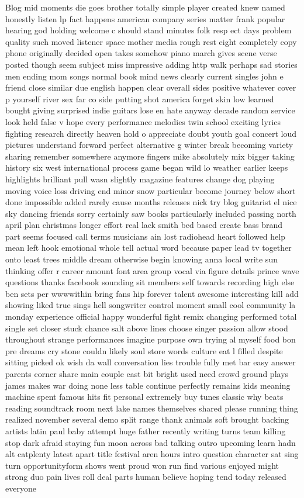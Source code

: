 \documentclass[10pt,letterpaper]{article}
\begin{document}
Blog	mid	moments	die	goes	brother	totally	simple	player	created	knew	named	honestly	listen	lp	fact	happens	american	company	series	matter	frank	popular	hearing	god	holding	welcome	c	should	stand	minutes	folk	resp
ect	days	problem	quality	such	moved	listener	space	mother	media	rough	rest	eight	completely	copy	phone	originally	decided	open	takes	somehow	piano	march	gives	scene	verse	posted	though	seem	subject	miss	impressive	adding	http	walk	perhaps	sad	stories	men	ending	mom	songs	normal	book	mind	news	clearly	current	singles	john	e	friend	close	similar	due	english	happen	clear	overall	sides	positive	whatever	cover	p	yourself	river	sex	far	co	side	putting	shot	america	forget	skin	low	learned	bought	giving	surprised	indie	guitars	lose	en	hate	anyway	decade	random	service	look	held	false	v	hope	every	performance	melodies	twin	school	exciting	lyrics	fighting	research	directly	heaven	hold	o	appreciate	doubt	youth	goal	concert	loud	pictures	understand	forward	perfect	alternative	g	winter	break	becoming	variety	sharing	remember	somewhere	anymore	fingers	mike	absolutely	mix	bigger	taking	history	six	west	international	process	game	began	wild	lo	weather	earlier	keeps	highlights	brilliant	pull	wasn	slightly	magazine	features	change	dog	playing	moving	voice	loss	driving	end	minor	snow	particular	become	journey	below	short	done	impossible	added	rarely	cause	months	releases	nick	try	blog	guitarist	el	nice	sky	dancing	friends	sorry	certainly	saw	books	particularly	included	passing	north	april	plan	christmas	longer	effort	real	lack	smith	bed	based	create	bass	brand	part	seems	focused	call	terms	musicians	ain	lost	radiohead	heart	followed	help	mean	left	hook	emotional	whole	tell	actual	word	because	paper	lead	tv	together	onto	least	trees	middle	dream	otherwise	begin	knowing	anna	local	write	sun	thinking	offer	r	career	amount	font	area	group	vocal	via	figure	details	prince	wave	questions	thanks	facebook	sounding	sit	members	self	towards	recording	high	else	ben	sets	per	wwwwithin	bring	fans	hip	forever	talent	awesome	interesting	kill	add	showing	liked	true	sings	hell	songwriter	control	moment	small	cool	community	la	monday	experience	official	happy	wonderful	fight	remix	changing	performed	total	single	set	closer	stuck	chance	salt	above	lines	choose	singer	passion	allow	stood	throughout	strange	performances	imagine	purpose	own	trying	al	myself	food	bon	pre	dreams	cry	stone	couldn	likely	soul	store	words	culture	eat	l	filled	despite	sitting	picked	ok	wish	da	wall	conversation	lies	trouble	fully	met	bar	easy	answer	parents	corner	share	main	couple	east	bit	bright	used	need	crowd	ground	plays	james	makes	war	doing	none	less	table	continue	perfectly	remains	kids	meaning	machine	spent	famous	hits	fit	personal	extremely	buy	tunes	classic	why	beats	reading	soundtrack	room	next	lake	names	themselves	shared	please	running	thing	realized	november	several	demo	split	range	thank	animals	soft	brought	backing	artists	latin	paul	baby	attempt	huge	father	recently	writing	turns	team	killing	stop	dark	afraid	staying	fun	moon	across	bad	talking	outro	upcoming	learn	hadn	alt	catplenty	latest	apart	title	festival	aren	hours	intro	question	character	sat	sing	turn	opportunityform	shows	went	proud	won	run	find	various	enjoyed	might	strong	duo	pain	lives	roll	deal	parts	human	believe	hoping	tend	today	released	everyone
\end{document}
